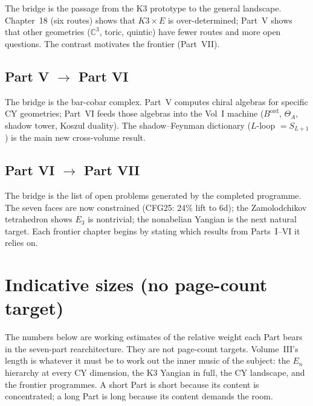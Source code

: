\documentclass[11pt]{article}
\newcommand{\En}{E_n}
\newcommand{\C}{\mathbb{C}}
\begin{document}
The bridge is the passage from the K3 prototype to the general
landscape. Chapter~18 (six routes) shows that $K3\times E$ is
over-determined; Part~V shows that other geometries ($\C^3$, toric,
quintic) have fewer routes and more open questions. The contrast
motivates the frontier (Part~VII).

\subsection{Part V $\to$ Part VI}

The bridge is the bar-cobar complex. Part~V computes chiral algebras
for specific CY geometries; Part~VI feeds those algebras into the
Vol~I machine ($B^{\mathrm{ord}}$, $\Theta_A$, shadow tower,
Koszul duality). The shadow--Feynman dictionary ($L$-loop $= S_{L+1}$)
is the main new cross-volume result.

\subsection{Part VI $\to$ Part VII}

The bridge is the list of open problems generated by the
completed programme. The seven faces are now constrained (CFG25: 24\%
lift to 6d); the Zamolodchikov tetrahedron shows $E_3$ is nontrivial;
the nonabelian Yangian is the next natural target. Each frontier chapter
begins by stating which results from Parts~I--VI it relies on.


\section{Indicative sizes (no page-count target)}

The numbers below are working estimates of the relative weight each
Part bears in the seven-part rearchitecture. They are not page-count
targets. Volume~III's length is whatever it must be to work out the
inner music of the subject: the $\En$ hierarchy at every CY dimension,
the K3 Yangian in full, the CY landscape, and the frontier programmes.
A short Part is short because its content is concentrated; a long Part
is long because its content demands the room.
\end{document}
